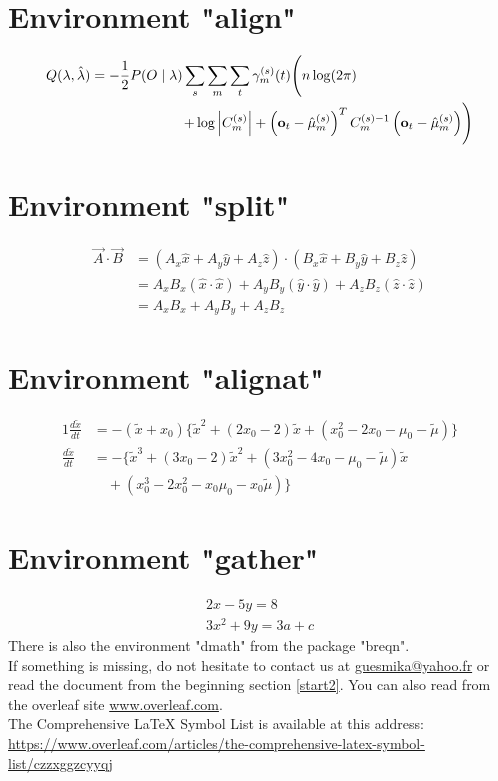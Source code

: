 \section{Environment "align"}
\begin{align}
	Q(\lambda,\hat{\lambda})
	= -\frac{1}{2} P(O \mid \lambda )
	\sum_s \sum_m \sum_t \gamma_m^{(s)} (t)
	\Biggl( n\log(2\pi)
	\mspace{150mu}
	\notag\\
	+ \log \left| C_m^{(s)} \right|
	+ \left( \mathbf{o}_t - \hat{\mu}_m^{(s)} \right)^T C_m^{(s)-1}
	\left(\mathbf{o}_t - \hat{\mu}_m^{(s)}\right)
	\Biggr)
\end{align}
\section{Environment "split"}
\begin{equation}
	\begin{split}
		\vec{A} \cdot \vec{B} & = (A_x \hat{x} + A_y \hat{y}+ A_z\hat{z}) \cdot (B_x \hat{x} + B_y \hat{y}+ B_z\hat{z}) \\
		& = A_xB_x(\hat{x} \cdot \hat{x}) + A_yB_y(\hat{y} \cdot \hat{y}) + A_zB_z (\hat{z} \cdot \hat{z}) \\
		&= A_xB_x + A_yB_y+A_zB_z
	\end{split}
\end{equation}
\section{Environment "alignat"}
\begin{alignat}{1}
	\frac{d\tilde{x}}{dt} &= -(\tilde{x}+x_0)\{\tilde{x}^2 + (2x_0-2)\tilde{x} + (x_0^2-2x_0-\mu_0-\tilde{\mu})\} \nonumber \\      
	\frac{d\tilde{x}}{dt} &= -\{\tilde{x}^3 + (3x_0-2)\tilde{x}^2 + (3x_0^2-4x_0-\mu_0-\tilde{\mu})\tilde{x} \\
	&{\hspace{12pt}} +(x_0^3 -2x_0^2 -x_0\mu_0 -x_0\tilde{\mu})\} \nonumber
\end{alignat} 
\section{Environment "gather"}
\begin{gather*} 
	2x - 5y =  8 \\ 
	3x^2 + 9y =  3a + c
\end{gather*}
There is also the environment "dmath" from the package "breqn".\\
If something is missing, do not hesitate to contact us at \href{mailto:guesmika@yahoo.fr}{guesmika@yahoo.fr} or read the document from the beginning section \ref{start2}. You can also read from the overleaf site \url{www.overleaf.com}.\\
The Comprehensive LaTeX Symbol List is available at this address:\\
\url{https://www.overleaf.com/articles/the-comprehensive-latex-symbol-list/czzxggzcyyqj}

